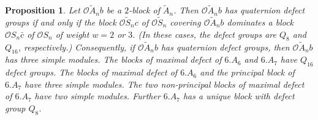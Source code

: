 \documentclass{amsart}
\theoremstyle{plain}\newtheorem{Theorem}{Theorem}[section]
\theoremstyle{plain}\newtheorem{Conjecture}[Theorem]{Conjecture}
\theoremstyle{plain}\newtheorem{Corollary}[Theorem]{Corollary}
\theoremstyle{plain}\newtheorem{Lemma}[Theorem]{Lemma}
\theoremstyle{plain}\newtheorem{Proposition}[Theorem]{Proposition}
\theoremstyle{definition}\newtheorem{Definition}[Theorem]{Definition}
\theoremstyle{definition}\newtheorem{Example}[Theorem]{Example}
\theoremstyle{definition}\newtheorem{Examples}[Theorem]{Examples}
\theoremstyle{definition}\newtheorem{Exercise}[Theorem]{Exercise}
\theoremstyle{definition}\newtheorem{Notation}[Theorem]{Notation}
\theoremstyle{definition}\newtheorem{Remark}[Theorem]{Remark}
\theoremstyle{definition}\newtheorem{Remarks}[Theorem]{Remarks}
\def\CO{{\mathcal{O}}}    \def\OPE{{\mathcal{O}(P\rtimes E)}}
\newcommand{\wt}{\widetilde}
\newcommand{\sym}{{S}}
\newcommand{\alt}{{A}}
\numberwithin{equation}{section}
\begin{document}
\begin{Proposition}\label{prop:alternatinggenquat}
    Let $\CO  \wt\alt_nb$ be a $2$-block  of $\wt\alt_n$. Then $\CO\wt\alt_n b$ has  quaternion defect groups if and only if the block $\CO \wt\sym_n c$ of $\CO \wt\sym_n$ covering $\CO\wt\alt_n b$ dominates a block $\CO \sym_n\bar c$ of $\CO\sym_n$ of weight $w=2$ or $3$. (In these cases, the defect groups are $Q_8$ and $Q_{16}$, respectively.)  Consequently, if $\CO\wt\alt_n b$ has  quaternion defect groups, then  $\CO\wt\alt_n b$  has  three simple modules.  The blocks of maximal defect of $6.\alt_6$ and $6.\alt_7$ have $Q_{16}$ defect groups. The blocks of maximal defect of $6.\alt_6$ and the principal block of $6.\alt_7$ have three simple modules. The two non-principal blocks of maximal defect of $6.\alt_7$ have two simple modules. Further $6.\alt_7$ has a unique block with defect group $Q_8$.
\end{Proposition}
\end{document}

